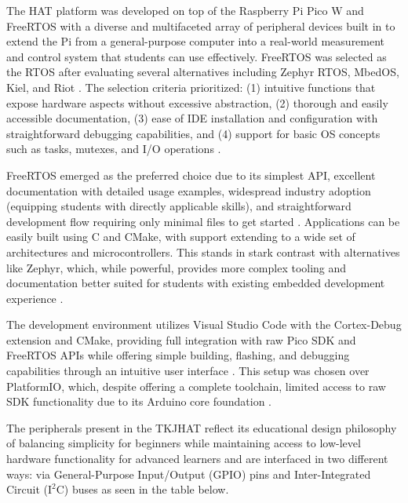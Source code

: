 The HAT platform was developed on top of the Raspberry Pi Pico W and FreeRTOS with a diverse and multifaceted array of peripheral devices built in to extend the Pi from a general-purpose computer into a real-world measurement and control system that students can use effectively. FreeRTOS was selected as the RTOS after evaluating several alternatives including Zephyr RTOS, MbedOS, Kiel, and Riot \cite{kelhala:2024}. The selection criteria prioritized: (1) intuitive functions that expose hardware aspects without excessive abstraction, (2) thorough and easily accessible documentation, (3) ease of IDE installation and configuration with straightforward debugging capabilities, and (4) support for basic OS concepts such as tasks, mutexes, and I/O operations \cite{kelhala:2024}.

FreeRTOS emerged as the preferred choice due to its simplest API, excellent documentation with detailed usage examples, widespread industry adoption (equipping students with directly applicable skills), and straightforward development flow requiring only minimal files to get started \cite{kelhala:2024}. Applications can be easily built using C and CMake, with support extending to a wide set of architectures and microcontrollers. This stands in stark contrast with alternatives like Zephyr, which, while powerful, provides more complex tooling and documentation better suited for students with existing embedded development experience \cite{kelhala:2024}.

The development environment utilizes Visual Studio Code with the Cortex-Debug extension and CMake, providing full integration with raw Pico SDK and FreeRTOS APIs while offering simple building, flashing, and debugging capabilities through an intuitive user interface \cite{kelhala:2024}. This setup was chosen over PlatformIO, which, despite offering a complete toolchain, limited access to raw SDK functionality due to its Arduino core foundation \cite{kelhala:2024}.

The peripherals present in the TKJHAT reflect its educational design philosophy of balancing simplicity for beginners while maintaining access to low-level hardware functionality for advanced learners \cite{kelhala:2024} and are interfaced in two different ways: via General-Purpose Input/Output (GPIO) pins and Inter-Integrated Circuit ($\text{I}^2\text{C}$) buses as seen in the table below.

